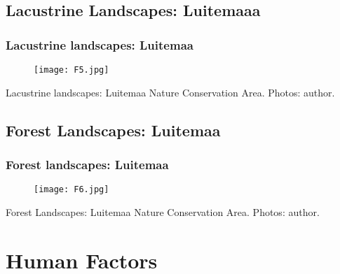 \documentclass[pdflatex,compress,8pt,
	xcolor={dvipsnames,dvipsnames,svgnames,x11names,table},
	hyperref={	
	breaklinks = true, 
	pdfauthor={Lemenkova Polina}, 
	pdfsubject={Preentation}, 
	pdfcreator={Lemenkova Polina}, 
	pdfproducer={Lemenkova Polina}, 
	colorlinks=true,
	linkcolor=Tomato, 
	citecolor=DeepPink3, 
	urlcolor = NavyBlue, 
	breaklinks = true}]{beamer}
\begin{document}
\subsection{Lacustrine Landscapes: Luitemaaa}
\begin{frame}\frametitle{Lacustrine landscapes: Luitemaa}
\vspace{3em}
\begin{figure}[H]
	\centering
		\texttt{[image: F5.jpg]}
\end{figure}
\begin{examples}{Lacustrine landscapes:}
Luitemaa Nature Conservation Area. Photos: author.
\end{examples}
\end{frame}

\subsection{Forest Landscapes: Luitemaa}
\begin{frame}\frametitle{Forest landscapes: Luitemaa}
\vspace{3em}
\begin{figure}[H]
	\centering
		\texttt{[image: F6.jpg]}
\end{figure}
\begin{examples}{Forest Landscapes:}
Luitemaa Nature Conservation Area. Photos: author.
\end{examples}
\end{frame}

\section{Human Factors}
\end{document}

